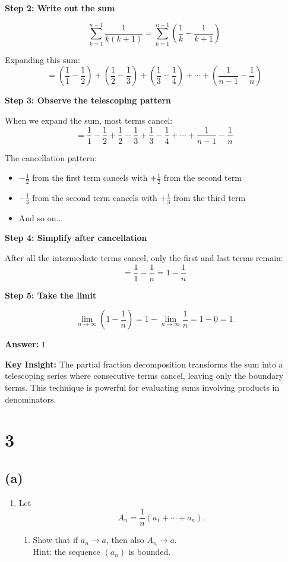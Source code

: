 \documentclass[12pt,a4paper]{article}
\theoremstyle{definition}
\theoremstyle{remark}
\begin{document}
\textbf{Step 2: Write out the sum}

$$\sum_{k=1}^{n-1} \frac{1}{k(k+1)} = \sum_{k=1}^{n-1} \left(\frac{1}{k} - \frac{1}{k+1}\right)$$

Expanding this sum:
$$= \left(\frac{1}{1} - \frac{1}{2}\right) + \left(\frac{1}{2} - \frac{1}{3}\right) + \left(\frac{1}{3} - \frac{1}{4}\right) + \cdots + \left(\frac{1}{n-1} - \frac{1}{n}\right)$$

\textbf{Step 3: Observe the telescoping pattern}

When we expand the sum, most terms cancel:
$$= \frac{1}{1} - \frac{1}{2} + \frac{1}{2} - \frac{1}{3} + \frac{1}{3} - \frac{1}{4} + \cdots + \frac{1}{n-1} - \frac{1}{n}$$

The cancellation pattern:
\begin{itemize}
\item $-\frac{1}{2}$ from the first term cancels with $+\frac{1}{2}$ from the second term
\item $-\frac{1}{3}$ from the second term cancels with $+\frac{1}{3}$ from the third term
\item And so on...
\end{itemize}

\textbf{Step 4: Simplify after cancellation}

After all the intermediate terms cancel, only the first and last terms remain:
$$= \frac{1}{1} - \frac{1}{n} = 1 - \frac{1}{n}$$

\textbf{Step 5: Take the limit}

$$\lim_{n \to \infty} \left(1 - \frac{1}{n}\right) = 1 - \lim_{n \to \infty} \frac{1}{n} = 1 - 0 = 1$$

\textbf{Answer:} $\boxed{1}$

\textbf{Key Insight:} The partial fraction decomposition transforms the sum into a telescoping series where consecutive terms cancel, leaving only the boundary terms. This technique is powerful for evaluating sums involving products in denominators.


\section*{3}
\subsection*{(a)}

\begin{enumerate}
    \item Let 
    \[
        A_n = \frac{1}{n}(a_1 + \cdots + a_n).
    \]
    \begin{enumerate}
        \item Show that if $a_n \to a$, then also $A_n \to a$. \\
        Hint: the sequence $(a_n)$ is bounded.
    \end{enumerate}
\end{enumerate}
\end{document}
